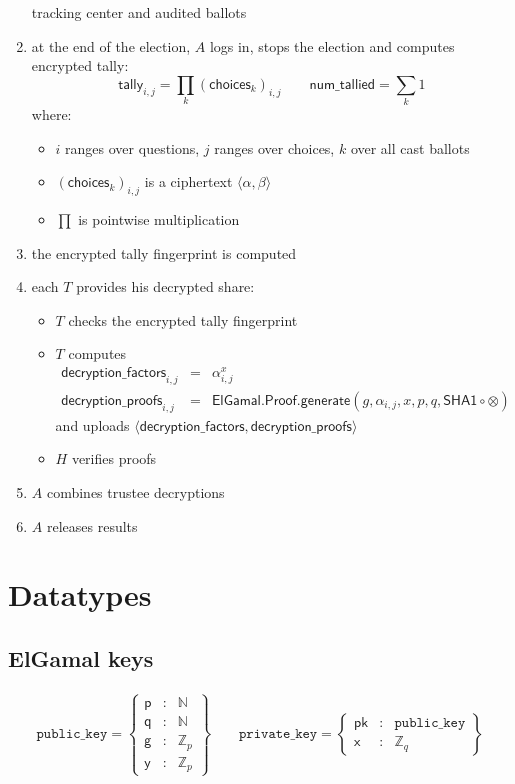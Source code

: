\documentclass[a4paper]{article}
\newcommand{\Z}{\mathbb{Z}}
\newcommand{\N}{\mathbb{N}}
\begin{document}
\begin{enumerate}
  tracking center and audited ballots
\item at the end of the election, $A$ logs in, stops the election and
  computes encrypted tally:
  \[
    \textsf{tally}_{i,j}=\prod_k (\textsf{choices}_k)_{i,j}
    \qquad
    \textsf{num\_tallied}=\sum_k 1
  \]
  where:
  \begin{itemize}
  \item $i$ ranges over questions, $j$ ranges over choices, $k$ over
    all cast ballots
  \item $(\textsf{choices}_k)_{i,j}$ is a ciphertext $\langle\alpha,\beta\rangle$
  \item $\prod$ is pointwise multiplication
  \end{itemize}
\item the encrypted tally fingerprint is computed
\item each $T$ provides his decrypted share:
  \begin{itemize}
  \item $T$ checks the encrypted tally fingerprint
  \item $T$ computes
    \[ \begin{array}{rcl}
      \textsf{decryption\_factors}_{i,j}&=&\alpha_{i,j}^x\\
      \textsf{decryption\_proofs}_{i,j}&=&\textsf{ElGamal.Proof.generate}(g,\alpha_{i,j},x,p,q,\textsf{SHA1}\circ\otimes)
    \end{array} \]
    and uploads $\langle\textsf{decryption\_factors},\textsf{decryption\_proofs}\rangle$
  \item $H$ verifies proofs
  \end{itemize}
\item $A$ combines trustee decryptions
\item $A$ releases results
\end{enumerate}

\section{Datatypes}

\subsection{ElGamal keys}
\label{key-format}

\begin{gather*}
  \texttt{public\_key}=\left\{
    \begin{array}{rcl}
      \textsf{p}&:&\N\\
      \textsf{q}&:&\N\\
      \textsf{g}&:&\Z_p\\
      \textsf{y}&:&\Z_p
    \end{array}
  \right\}
  \qquad
  \texttt{private\_key}=\left\{
    \begin{array}{rcl}
      \textsf{pk}&:&\texttt{public\_key}\\
      \textsf{x}&:&\Z_q
    \end{array}
  \right\}
\end{gather*}
\end{document}
